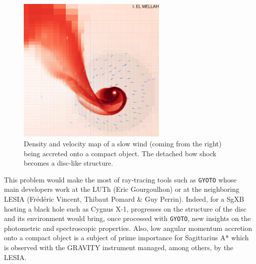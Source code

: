 \documentclass[a4paper,12pt,onecolumn]{article}
\newcommand{\sgx}{SgXB\xspace}
\begin{document}
\begin{figure}
\vspace*{-0.5cm}
\hspace*{0.1cm}
\includegraphics[height=7.1cm]{Figures/wind-RLOF.png}
\caption{Density and velocity map of a slow wind (coming from the right) being accreted onto a compact object. The detached bow shock becomes a disc-like structure.}
\label{fig:wind-RLOF}
\end{figure} 

\indent This problem would make the most of ray-tracing tools such as \texttt{GYOTO} \citep{Vincent2011} whose main developers work at the LUTh (Eric Gourgoulhon) or at the neighboring LESIA (Fr\'ed\'eric Vincent, Thibaut Pomard \& Guy Perrin). Indeed, for a \sgx hosting a black hole such as Cygnus X-1, progresses on the structure of the disc and its environment would bring, once processed with \texttt{GYOTO}, new insights on the photometric and spectroscopic properties. Also, low angular momentum accretion onto a compact object is a subject of prime importance for Sagittarius A* which is observed with the GRAVITY instrument managed, among others, by the LESIA.

\clearpage


\newpage
\end{document}
